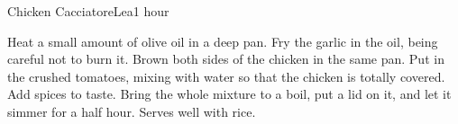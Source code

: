 \begin{recipe}{Chicken Cacciatore}{Lea}{1 hour}

  Heat a small amount of olive oil in a deep pan. Fry the garlic in the oil,
  being careful not to burn it. Brown both sides of the chicken in the same
  pan. Put in the crushed tomatoes, mixing with water so that the chicken is
  totally covered. Add spices to taste. Bring the whole mixture to a boil, put
  a lid on it, and let it simmer for a half hour. Serves well with rice.
\end{recipe}
